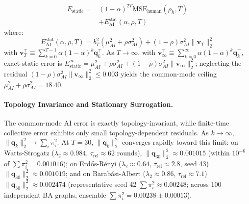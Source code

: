 \documentclass
[letterpaper]{article}
\begin{document}
\begin{enumerate}
    \begin{align}
    E_{\text{static}} ={}& (1 - \alpha)^{2T} \text{MSE}_{\text{human}}(\rho_h, T) \nonumber \\
    &+ E_{\text{AI}}^{\text{stat}}(\alpha, \rho, T)
    \label{eq:static_error}
    \end{align}
    where:
    \begin{equation}
    E_{\text{AI}}^{\text{stat}}(\alpha, \rho, T) = b_T^2 \left( \mu_{AI}^2 + \rho \sigma_{AI}^2 \right) + (1 - \rho)\sigma_{AI}^2 \|\mathbf{v}_T\|_2^2
    \end{equation}
    with $\mathbf{v}_T^\top \equiv \sum_{k=0}^{T-1} \alpha (1 - \alpha)^k \mathbf{q}_k^\top$. As $T \to \infty$, with $\mathbf{v}_\infty^\top \equiv \sum_{k=0}^\infty \alpha(1-\alpha)^k \mathbf{q}_k^\top$, exact static error is $E_{\text{static}}^\infty = \mu_{AI}^2 + \rho \sigma_{AI}^2 + (1 - \rho)\sigma_{AI}^2 \|\mathbf{v}_\infty\|_2^2$; neglecting the residual $(1-\rho)\sigma_{AI}^2 \|\mathbf{v}_\infty\|_2^2 \le 0.003$ yields the common-mode ceiling $\mu_{AI}^2 + \rho \sigma_{AI}^2 = 18.40$.
\end{enumerate}

\paragraph{Topology Invariance and Stationary Surrogation.}
The common-mode AI error is exactly topology-invariant, while finite-time collective error exhibits only small topology-dependent residuals. As $k \to \infty$, $\|\mathbf{q}_k\|_2^2 \to \sum_i \pi_i^2$. At $T = 30$, $\|\mathbf{q}_k\|_2^2$ converges rapidly toward this limit: on Watts-Strogatz ($\lambda_2 \approx 0.984$, $\tau_{\text{rel}} \approx 62$ rounds), $\|\mathbf{q}_{30}\|_2^2 \approx 0.001015$ (within $10^{-6}$ of $\sum \pi_i^2 = 0.001016$); on Erd\H{o}s-R\'enyi ($\lambda_2 \approx 0.64$, $\tau_{\text{rel}} \approx 2.8$, seed 43) $\|\mathbf{q}_{30}\|_2^2 \approx 0.001019$; and on Barab\'asi-Albert ($\lambda_2 \approx 0.86$, $\tau_{\text{rel}} \approx 7.1$) $\|\mathbf{q}_{30}\|_2^2 \approx 0.002474$ (representative seed 42 $\sum \pi_i^2 \approx 0.00248$; across 100 independent BA graphs, ensemble $\sum \pi_i^2 = 0.00238 \pm 0.00013$).
\end{document}
